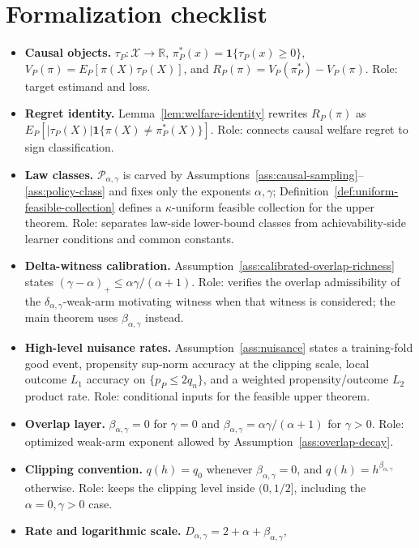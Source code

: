 \documentclass[11pt]{article}
\newcommand{\one}{\mathbf{1}}
\theoremstyle{definition}
\theoremstyle{plain}
\theoremstyle{remark}
\begin{document}
\section{Formalization checklist}
\begin{itemize}[leftmargin=*]
\item \textbf{Causal objects.}  \(\tau_P:\mathcal X\to\mathbb R\),
\(\pi_P^*(x)=\one\{\tau_P(x)\ge0\}\), \(V_P(\pi)=E_P[\pi(X)\tau_P(X)]\),
and \(R_P(\pi)=V_P(\pi_P^*)-V_P(\pi)\).  Role: target estimand and loss.
\item \textbf{Regret identity.}  Lemma~\ref{lem:welfare-identity} rewrites
\(R_P(\pi)\) as
\(E_P[|\tau_P(X)|\one\{\pi(X)\ne\pi_P^*(X)\}]\).  Role: connects causal
welfare regret to sign classification.
\item \textbf{Law classes.}  \(\mathcal P_{\alpha,\gamma}\) is carved by
Assumptions~\ref{ass:causal-sampling}--\ref{ass:policy-class} and fixes
only the exponents \(\alpha,\gamma\); Definition~\ref{def:uniform-feasible-collection}
defines a \(\kappa\)-uniform feasible collection for the upper theorem.
Role: separates law-side lower-bound classes from achievability-side learner
conditions and common constants.
\item \textbf{Delta-witness calibration.}
Assumption~\ref{ass:calibrated-overlap-richness} states
\((\gamma-\alpha)_+\le\alpha\gamma/(\alpha+1)\).  Role: verifies the
overlap admissibility of the \(\delta_{\alpha,\gamma}\)-weak-arm motivating
witness when that witness is considered; the main theorem uses
\(\beta_{\alpha,\gamma}\) instead.
\item \textbf{High-level nuisance rates.}  Assumption~\ref{ass:nuisance}
states a training-fold good event, propensity sup-norm accuracy at the
clipping scale, local outcome \(L_1\) accuracy on \(\{p_P\le2q_n\}\), and a
weighted propensity/outcome \(L_2\) product rate.  Role: conditional inputs
for the feasible upper theorem.
\item \textbf{Overlap layer.}  \(\beta_{\alpha,\gamma}=0\) for \(\gamma=0\)
and \(\beta_{\alpha,\gamma}=\alpha\gamma/(\alpha+1)\) for \(\gamma>0\).
Role: optimized weak-arm exponent allowed by Assumption~\ref{ass:overlap-decay}.
\item \textbf{Clipping convention.}  \(q(h)=q_0\) whenever
\(\beta_{\alpha,\gamma}=0\), and
\(q(h)=h^{\beta_{\alpha,\gamma}}\) otherwise.  Role: keeps the clipping level
inside \((0,1/2]\), including the \(\alpha=0,\gamma>0\) case.
\item \textbf{Rate and logarithmic scale.}
\(D_{\alpha,\gamma}=2+\alpha+\beta_{\alpha,\gamma}\),

\end{itemize}
\end{document}
